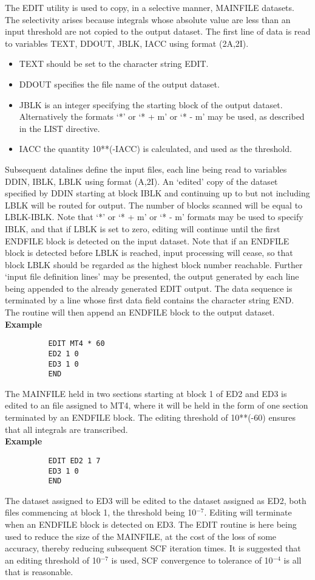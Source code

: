 \documentclass[11pt,fleqn]{article}
\begin{document}
The EDIT utility is used to copy, in a selective manner, MAINFILE
datasets. The selectivity arises because integrals whose absolute value
are less than an input threshold are not copied to the output dataset.
The first line of data is read to variables TEXT, DDOUT, JBLK, IACC using
format (2A,2I).
\begin{itemize}
\item  TEXT should be set to the character string EDIT.
\item  DDOUT specifies the file name of the output dataset.
\item  JBLK is an integer specifying the starting block of the output
dataset. Alternatively the formats `*' or `* + m' or
`* - m' may be used, as described in the LIST directive.
\item  IACC the quantity 10**(-IACC) is calculated, and used as the
threshold.
\end{itemize}
 Subsequent datalines define the input files, each line being read to
variables DDIN, IBLK, LBLK using format (A,2I). An `edited' copy of the
dataset specified by DDIN starting at block IBLK and continuing up to
but not including LBLK will be routed for output. The number of blocks
scanned will be equal to LBLK-IBLK. Note that `*' or `* + m' or `* - m'
formats may be used to specify IBLK, and that if LBLK is set to zero,
editing will continue until the first ENDFILE block is detected on the
input dataset. Note that if an ENDFILE block is detected before LBLK is
reached, input processing will cease, so that block LBLK should be
regarded as the highest block number reachable. Further `input file
definition lines' may be presented, the output generated by each line
being appended to the already generated EDIT output. The data sequence
is terminated by a line whose first data field contains the character
string END. The routine will then append an ENDFILE block to the output
dataset.\\

{\bf Example}
{
\footnotesize
\begin{verbatim}
          EDIT MT4 * 60
          ED2 1 0
          ED3 1 0
          END
\end{verbatim}
}
The MAINFILE held in two sections starting at block 1 of ED2 and ED3 is
edited to an file assigned to MT4, where it will be held in the
form of one section terminated by an ENDFILE block. The editing
threshold of 10**(-60) ensures that all integrals are transcribed.\\

{\bf Example}
{
\footnotesize
\begin{verbatim}
          EDIT ED2 1 7
          ED3 1 0
          END
\end{verbatim}
}
The dataset assigned to ED3 will be edited to the dataset assigned as
ED2, both files commencing at block 1, the threshold being 10$^{-7}$.
Editing will terminate when an ENDFILE block is detected on ED3.
The EDIT routine is here being used to reduce the size of the MAINFILE,
at the cost of the loss of some accuracy, thereby reducing subsequent
SCF iteration times. It is suggested that an editing threshold of
10$^{-7}$ is used, SCF convergence to tolerance of 10$^{-4}$ is all
that is reasonable.
\end{document}
